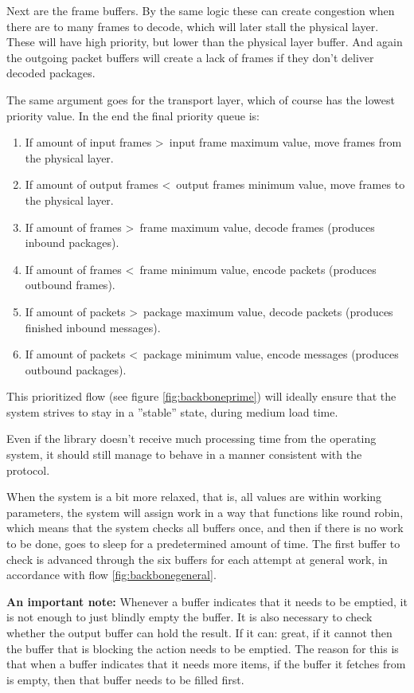 Next are the frame buffers. By the same logic these can create congestion when there are to many frames to decode, which will later stall the physical layer. These will have high priority, but lower than the physical layer buffer.
And again the outgoing packet buffers will create a lack of frames if they don't deliver decoded packages.

The same argument goes for the transport layer, which of course has the lowest priority value.
 In the end the final priority queue is:

\begin{enumerate}
\item If amount of input frames \textgreater\, input frame maximum value, move frames from the physical layer.
\item If amount of output frames \textless\, output frames minimum value, move frames to the physical layer.
\item If amount of frames \textgreater\, frame maximum value, decode frames (produces inbound packages).
\item If amount of frames \textless\, frame minimum value, encode packets (produces outbound frames).
\item If amount of packets \textgreater\, package maximum value, decode packets (produces finished inbound messages).
\item If amount of packets \textless\, package minimum value, encode messages (produces outbound packages).
\end{enumerate}


This prioritized flow (see figure \ref{fig:backboneprime}) will ideally ensure that the system strives to stay in a ''stable'' state, during medium load time. 


Even if the library doesn't receive much processing time from the operating system, it should still manage to behave in a manner consistent with the protocol.


When the system is a bit more relaxed, that is, all values are within working parameters, the system will assign work in a way that functions like round robin, which means that the system checks all buffers once, and then if there is no work to be done, goes to sleep for a predetermined amount of time. The first buffer to check is advanced through the six buffers for each attempt at general work, in accordance with flow \ref{fig:backbonegeneral}.




\textbf{An important note:}
Whenever a buffer indicates that it needs to be emptied, it is not enough to just blindly empty the buffer. It is also necessary to check whether the output buffer can hold the result. If it can: great, if it cannot then the buffer that is blocking the action needs to be emptied.
The reason for this is that when a buffer indicates that it needs more items, if the buffer it fetches from is empty, then that buffer needs to be filled first.


